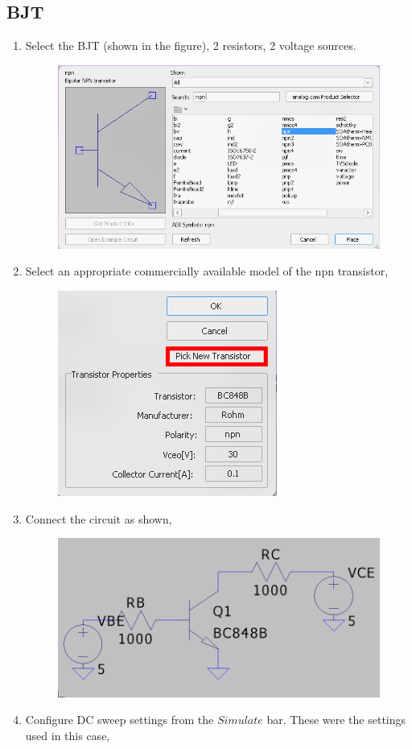 \documentclass[12pt,a4paper]{report}
\begin{document}
\subsection{BJT}
\begin{enumerate}
    \item Select the BJT (shown in the figure), 2 resistors, 2 voltage sources.
    \pagebreak
    \begin{figure}[h!]
        \centering
        \includegraphics[width = 0.6\linewidth]{figs/component-bjt.png}
        \label{fig:placeholder}
    \end{figure}
    \item Select an appropriate commercially available model of the npn transistor,
    \begin{figure}[h!]
        \centering
        \includegraphics[width=0.5\linewidth]{figs/bjt-model.png}
        \label{fig:placeholder}
    \end{figure}
    \item Connect the circuit as shown,
    \begin{figure}[h!]
        \centering
        \includegraphics[width=0.5\linewidth]{figs/bjt-circuit.png}
        \label{fig:placeholder}
    \end{figure}
    \item Configure DC sweep settings from the $Simulate$ bar. These were the settings used in this case,
  \begin{figure}[h!]
  \centering
  

\end{figure}
\end{enumerate}
\end{document}
